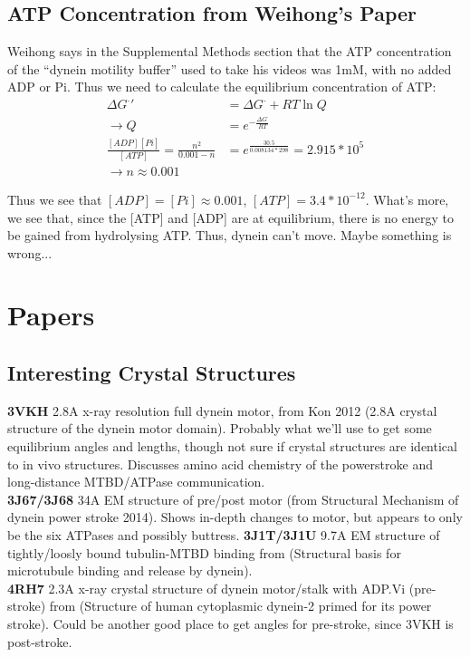 \documentclass[10pt]{article} %
\begin{document}
\subsection{ATP Concentration from Weihong's Paper}
Weihong says in the Supplemental Methods section that the ATP concentration of the ``dynein motility buffer'' used to take his videos was 1mM, with no added ADP or Pi. Thus we need to calculate the equilibrium concentration of ATP:\\

\begin{align*}
  \Delta G^\cdot' &= \Delta G^\cdot + RT\ln Q\\
  \rightarrow Q &= e^{-\frac{\Delta G^\cdot}{RT}}\\
  \frac{[ADP][Pi]}{[ATP]} = \frac{n^2}{0.001 - n} &= e^{\frac{30.5}{0.008134*298}} = 2.915 * 10^{5}\\
  \rightarrow n \approx 0.001
\end{align*}

Thus we see that $[ADP] = [Pi] \approx 0.001$, $[ATP] = 3.4*10^{-12}$. What's more, we see that, since the [ATP] and [ADP] are at equilibrium, there is no energy to be gained
from hydrolysing ATP. Thus, dynein can't move. Maybe something is wrong...\\

\section{Papers}

\subsection{Interesting Crystal Structures}
\textbf{3VKH} 2.8A x-ray resolution full dynein motor, from Kon 2012 (2.8A crystal structure of the dynein motor domain). Probably what we'll use to get some equilibrium angles and lengths, though not sure if crystal structures are identical to in vivo structures. Discusses amino acid chemistry of the powerstroke and long-distance MTBD/ATPase communication.\\
\textbf{3J67/3J68} 34A EM structure of pre/post motor (from Structural Mechanism of dynein power stroke 2014). Shows in-depth changes to motor, but appears to only be the six ATPases and possibly buttress.
\textbf{3J1T/3J1U} 9.7A EM structure of tightly/loosly bound tubulin-MTBD binding from (Structural basis for microtubule binding and release by dynein).\\
\textbf{4RH7} 2.3A x-ray crystal structure of dynein motor/stalk with ADP.Vi (pre-stroke) from (Structure of human cytoplasmic dynein-2 primed for its power stroke). Could be another good place to get angles for pre-stroke, since 3VKH is post-stroke.\\
\end{document}
